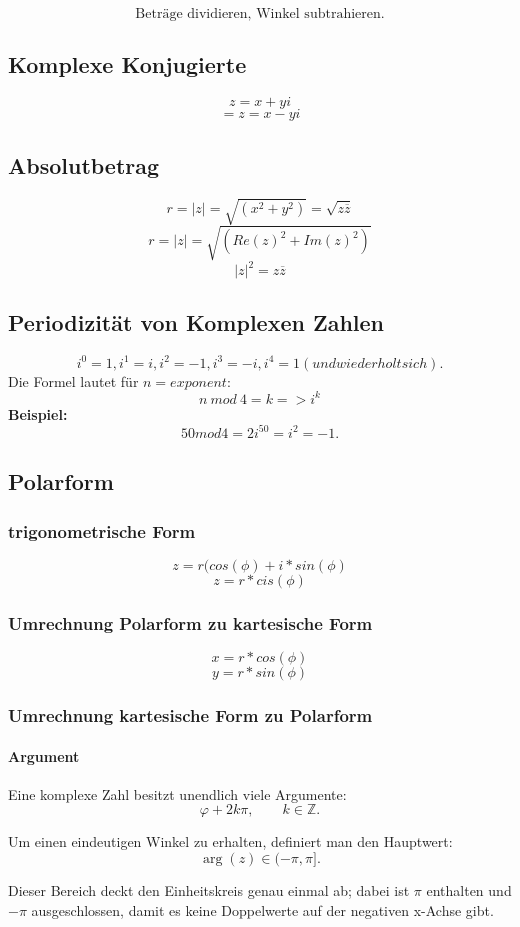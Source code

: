 \documentclass[10pt,a4paper,twocolumn]{article}
\begin{document}
	\[
	\text{Beträge dividieren, Winkel subtrahieren.}
	\]
	
	\subsection{Komplexe Konjugierte}
	$$z=x+yi$$
	$$={z}=x-yi$$
	
	\subsection{Absolutbetrag}
	$$r=\vert z \vert=\sqrt{(x^2+y^2)}=\sqrt{z\overline{z}}$$
	$$r=\vert z \vert=\sqrt{(Re(z)^2+Im(z)^2)}$$
	$$|z|^2=z\overline{z}$$
	
	\subsection{Periodizität von Komplexen Zahlen}
	$$i^0=1,i^1=i,i^2=-1,i^3=-i,i^4=1 (und wiederholt sich).$$
	Die Formel lautet für $n=exponent$:
	$$n\ mod \ 4 = k => i^k$$
	\textbf{Beispiel:}
	$$50 mod 4=2i^{50}=i^2=-1.$$
	\subsection{Polarform}
	\subsubsection{trigonometrische Form}
	$$z=r(cos(\phi)+i*sin(\phi)$$
	$$z=r*cis(\phi)$$
	
	\subsubsection{Umrechnung Polarform zu kartesische Form}
	$$x = r*cos(\phi)$$
	$$y = r*sin(\phi)$$
	\subsubsection{Umrechnung kartesische Form zu Polarform}
	\paragraph{Argument}
	Eine komplexe Zahl besitzt unendlich viele Argumente:
	\[
	\varphi + 2k\pi,\qquad k\in\mathbb{Z}.
	\]
	
	Um einen eindeutigen Winkel zu erhalten, definiert man den Hauptwert:
	\[
	\arg(z)\in(-\pi,\pi].
	\]
	
	Dieser Bereich deckt den Einheitskreis genau einmal ab; dabei ist
	\(\pi\) enthalten und \(-\pi\) ausgeschlossen, damit es keine
	Doppelwerte auf der negativen x-Achse gibt.
	
\end{document}
